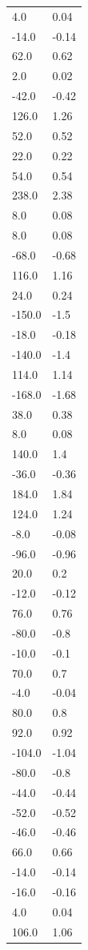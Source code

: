 \begin{longtable}{ll}
4.0 & 0.04 \\
-14.0 & -0.14 \\
62.0 & 0.62 \\
2.0 & 0.02 \\
-42.0 & -0.42 \\
126.0 & 1.26 \\
52.0 & 0.52 \\
22.0 & 0.22 \\
54.0 & 0.54 \\
238.0 & 2.38 \\
8.0 & 0.08 \\
8.0 & 0.08 \\
-68.0 & -0.68 \\
116.0 & 1.16 \\
24.0 & 0.24 \\
-150.0 & -1.5 \\
-18.0 & -0.18 \\
-140.0 & -1.4 \\
114.0 & 1.14 \\
-168.0 & -1.68 \\
38.0 & 0.38 \\
8.0 & 0.08 \\
140.0 & 1.4 \\
-36.0 & -0.36 \\
184.0 & 1.84 \\
124.0 & 1.24 \\
-8.0 & -0.08 \\
-96.0 & -0.96 \\
20.0 & 0.2 \\
-12.0 & -0.12 \\
76.0 & 0.76 \\
-80.0 & -0.8 \\
-10.0 & -0.1 \\
70.0 & 0.7 \\
-4.0 & -0.04 \\
80.0 & 0.8 \\
92.0 & 0.92 \\
-104.0 & -1.04 \\
-80.0 & -0.8 \\
-44.0 & -0.44 \\
-52.0 & -0.52 \\
-46.0 & -0.46 \\
66.0 & 0.66 \\
-14.0 & -0.14 \\
-16.0 & -0.16 \\
4.0 & 0.04 \\
106.0 & 1.06 \\

\end{longtable}
